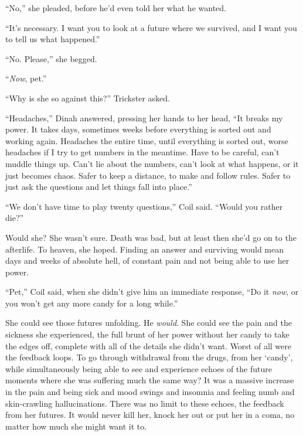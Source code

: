 ``No,'' she pleaded, before he'd even told her what he wanted.



``It's necessary.  I want you to look at a future where we survived, and I want you to tell us what happened.''



``No.  Please,'' she begged.



``\emph{Now}, pet.''



``Why is she so against this?'' Trickster asked.



``Headaches,'' Dinah answered, pressing her hands to her head,  ``It breaks my power.  It takes days, sometimes weeks before everything is sorted out and working again.  Headaches the entire time, until everything is sorted out, worse headaches if I try to get numbers in the meantime.  Have to be careful, can't muddle things up.  Can't lie about the numbers, can't look at what happens, or it just becomes chaos.  Safer to keep a distance, to make and follow rules.  Safer to just ask the questions and let things fall into place.''



``We don't have time to play twenty questions,'' Coil said.  ``Would you rather die?''



Would she?  She wasn't sure.  Death was bad, but at least then she'd go on to the afterlife.  To heaven, she hoped.  Finding an answer and surviving would mean days and weeks of absolute hell, of constant pain and not being able to use her power.



``Pet,'' Coil said, when she didn't give him an immediate response, ``Do it \emph{now}, or you won't get any more candy for a long while.''



She could see those futures unfolding.  He \emph{would}.  She could see the pain and the sickness she experienced, the full brunt of her power without her candy to take the edges off, complete with all of the details she didn't want.  Worst of all were the feedback loops.  To go through withdrawal from the drugs, from her `candy', while simultaneously being able to see and experience echoes of the future moments where she was suffering much the same way?  It was a massive increase in the pain and being sick and mood swings and insomnia and feeling numb and skin-crawling hallucinations.  There was no limit to these echoes, the feedback from her futures.  It would never kill her, knock her out or put her in a coma, no matter how much she might want it to.



